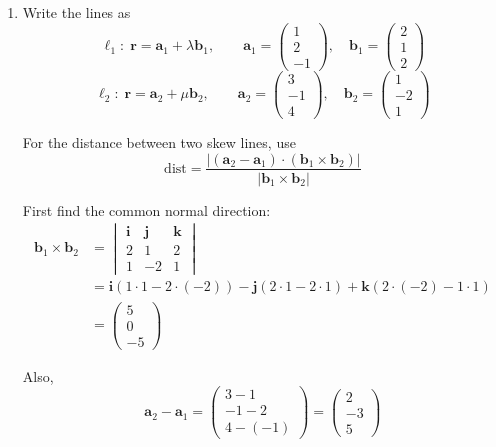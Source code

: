 \documentclass[leqno]{article}
\begin{document}
\begin{enumerate}[
  label=\textbf{\arabic*.},
  leftmargin=*,
  topsep=0pt,
  partopsep=0pt,
  parsep=0pt
]
\begin{tcolorbox}[colback=white, colframe=scarlet, title={\textbf{Solution}}, breakable, grow to left by=6mm, grow to right by=10mm]
\begin{enumerate}[label=\textbf{(\alph*)}]
  \item Write the lines as
\[
\ell_1:\;\mathbf r=\mathbf a_1+\lambda \mathbf b_1,
\qquad
\mathbf a_1=\begin{pmatrix}1\\2\\-1\end{pmatrix},
\quad
\mathbf b_1=\begin{pmatrix}2\\1\\2\end{pmatrix}
\]
\[
\ell_2:\;\mathbf r=\mathbf a_2+\mu \mathbf b_2,
\qquad
\mathbf a_2=\begin{pmatrix}3\\-1\\4\end{pmatrix},
\quad
\mathbf b_2=\begin{pmatrix}1\\-2\\1\end{pmatrix}
\]

For the distance between two skew lines, use
\[
\mathrm{dist}
=\frac{\left\lvert(\mathbf a_2-\mathbf a_1)\cdot(\mathbf b_1\times\mathbf b_2)\right\rvert}
{\left\lvert\mathbf b_1\times\mathbf b_2\right\rvert}
\]

First find the common normal direction:
\begin{align*}
\mathbf b_1\times\mathbf b_2
&=
\begin{vmatrix}
\mathbf i & \mathbf j & \mathbf k\\
2&1&2\\
1&-2&1
\end{vmatrix} \\
&=\mathbf i(1\cdot 1-2\cdot(-2))-\mathbf j(2\cdot 1-2\cdot 1)+\mathbf k(2\cdot(-2)-1\cdot 1) \\
&=\begin{pmatrix}5\\0\\-5\end{pmatrix}
\end{align*}

Also,
\[
\mathbf a_2-\mathbf a_1
=\begin{pmatrix}3-1\\-1-2\\4-(-1)\end{pmatrix}
=\begin{pmatrix}2\\-3\\5\end{pmatrix}
\]


\end{enumerate}
\end{tcolorbox}
\end{enumerate}
\end{document}
